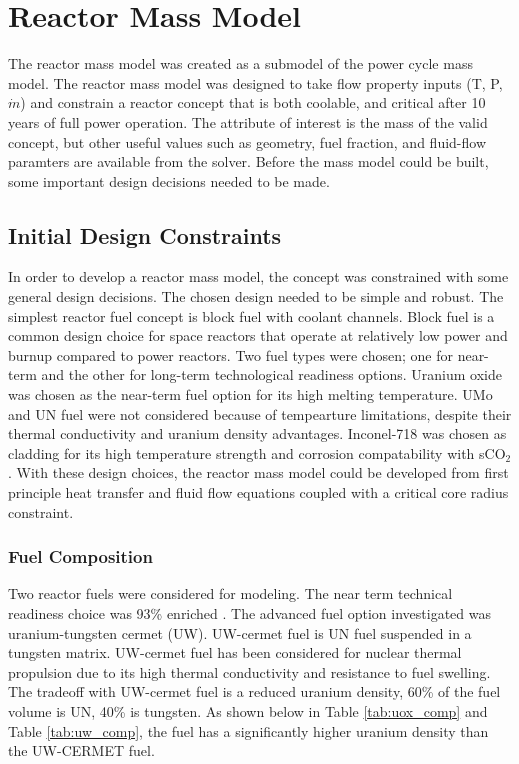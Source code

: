 \section{Reactor Mass Model} \label{reactor_mass_model}
The reactor mass model was created as a submodel of the power cycle mass
model. The reactor mass model was designed to take flow property inputs (T, P,
$\dot{m}$) and constrain a reactor concept that is both coolable, and critical
after 10 years of full power operation. The attribute of interest is the mass of
the valid concept, but other useful values such as geometry, fuel fraction,
and fluid-flow paramters are available from the solver. Before the mass model
could be built, some important design decisions needed to be made.

\subsection{Initial Design Constraints}
    In order to develop a reactor mass model, the concept was constrained with
some general design decisions. The chosen design needed to be simple and robust. The simplest reactor fuel concept is block fuel with coolant channels. 
Block fuel is a common design choice for space reactors that operate at relatively 
low power and burnup compared to power reactors. Two fuel types were chosen; one for
near-term and the other for long-term technological readiness options. Uranium
oxide was chosen as the near-term fuel option for its high melting temperature.
UMo and UN fuel were not considered because of tempearture limitations, despite
their thermal conductivity and uranium density advantages. Inconel-718 was
chosen as cladding for its high temperature strength and corrosion
compatability with sCO$_2$. With these design choices, the reactor mass model
could be developed from first principle heat transfer and fluid flow equations
coupled with a critical core radius constraint.

\subsubsection{Fuel Composition}
Two reactor fuels were considered for modeling. The near term technical
readiness choice was 93\% enriched \uox. The advanced fuel option investigated
was uranium-tungsten cermet (UW). UW-cermet fuel is UN fuel suspended in a
tungsten matrix. UW-cermet fuel has been considered for nuclear thermal
propulsion due to its high thermal conductivity and resistance to fuel swelling.
The tradeoff with UW-cermet fuel is a reduced uranium density, 60\% of the fuel
volume is UN, 40\% is tungsten. As shown below in Table \ref{tab:uox_comp} and
Table \ref{tab:uw_comp}, the \uox fuel has a significantly higher uranium
density than the UW-CERMET fuel.

